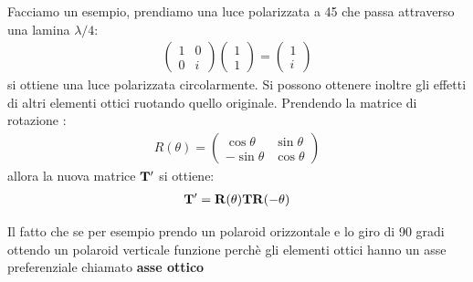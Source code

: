 Facciamo un esempio, prendiamo una luce polarizzata a 45 che passa attraverso una lamina $\lambda/4$:
\begin{align*}
    \begin{pmatrix} 1 & 0 \\ 0 & i\end{pmatrix}\begin{pmatrix}1\\1\end{pmatrix} = \begin{pmatrix}1\\i\end{pmatrix}
\end{align*}
si ottiene una luce polarizzata circolarmente.
Si possono ottenere inoltre gli effetti di altri elementi ottici ruotando quello originale.
Prendendo la matrice di rotazione : 
\begin{align*}
    R(\theta) = \begin{pmatrix}\cos{\theta} & \sin{\theta} \\ -\sin{\theta} & \cos{\theta} \end{pmatrix}
\end{align*}
allora la nuova matrice $\vb{T}^{\prime}$ si ottiene:
\begin{align*}
        \vb{T}^{\prime} = \vb{R}(\theta)\vb{T}\vb{R}(-\theta)
\end{align*}
\begin{tcolorbox}[colback=red!5!white,colframe=red!50!black,title=ATTENZIONE !]
Il fatto che se per esempio prendo un polaroid orizzontale e lo giro di 90 gradi ottendo un polaroid verticale 
funzione perchè gli elementi ottici hanno un asse preferenziale chiamato \textbf{asse ottico}
\end{tcolorbox}

